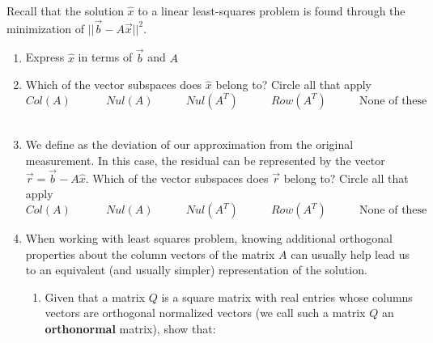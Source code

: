 

Recall that the solution $\hat{x}$ to a linear least-squares problem is found through the minimization of $||\vec{b} - A\vec{x}||^2$. 
\begin{enumerate}
    \item Express $\hat{x}$ in terms of $\vec{b}$ and $A$ \\
    \item Which of the vector subspaces does $\hat{x}$ belong to? Circle all that apply
    $$Col(A) \:\:\:\:\:\:\:\:\:\:\:\:\:\: Nul(A) \:\:\:\:\:\:\:\:\:\:\:\:\: Nul(A^T) \:\:\:\:\:\:\:\:\:\:\:\:\: Row(A^T) \:\:\:\:\:\:\:\:\:\:\:\:\: \text{None of these}$$ 
     \\
    \item We define  as the deviation of our approximation from the original measurement. In this case, the residual can be represented by the vector $\vec{r} = \vec{b} - A\hat{x}$. Which of the vector subspaces does $\vec{r}$ belong to? Circle all that apply
    $$Col(A) \:\:\:\:\:\:\:\:\:\:\:\:\:\: Nul(A) \:\:\:\:\:\:\:\:\:\:\:\:\: Nul(A^T) \:\:\:\:\:\:\:\:\:\:\:\:\: Row(A^T) \:\:\:\:\:\:\:\:\:\:\:\:\: \text{None of these}$$
    \item When working with least squares problem, knowing additional orthogonal properties about the column vectors of the matrix $A$ can usually help lead us to an equivalent (and usually simpler) representation of the solution. 
    \begin{enumerate}
        \item Given that a matrix $Q$ is a square matrix with real entries whose columns vectors are orthogonal normalized vectors (we call such a matrix $Q$ an \textbf{orthonormal} matrix), show that:

\end{enumerate}
\end{enumerate}
